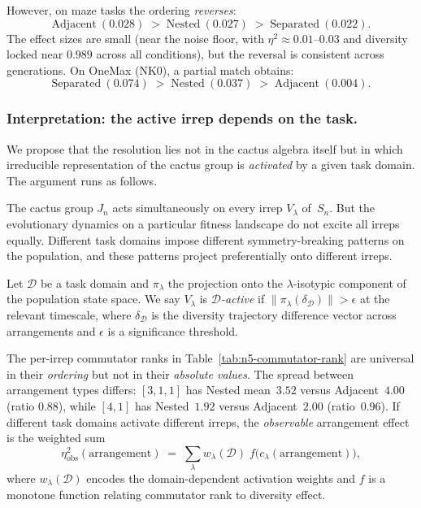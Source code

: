 
However, on maze tasks the ordering \emph{reverses}:
\[
  \text{Adjacent}~(0.028) \;>\;
  \text{Nested}~(0.027) \;>\;
  \text{Separated}~(0.022).
\]
The effect sizes are small (near the noise floor, with $\eta^2 \approx
0.01$--$0.03$ and diversity locked near $0.989$ across all conditions),
but the reversal is consistent across generations.  On OneMax (NK0),
a partial match obtains:
\[
  \text{Separated}~(0.074) \;>\;
  \text{Nested}~(0.037) \;>\;
  \text{Adjacent}~(0.004).
\]

\subsubsection{Interpretation: the active irrep depends on the task.}

We propose that the resolution lies not in the cactus algebra itself
but in which irreducible representation of the cactus group is
\emph{activated} by a given task domain.  The argument runs as
follows.

The cactus group $J_n$ acts simultaneously on every irrep $V_\lambda$
of~$S_n$.  But the evolutionary dynamics on a particular fitness
landscape do not excite all irreps equally.  Different task domains
impose different symmetry-breaking patterns on the population, and
these patterns project preferentially onto different irreps.

\begin{definition}
\label{def:active-irrep}
Let $\mathcal{D}$ be a task domain and $\pi_\lambda$ the projection
onto the $\lambda$-isotypic component of the population state space.
We say $V_\lambda$ is \emph{$\mathcal{D}$-active} if
$\|\pi_\lambda(\delta_{\mathcal{D}})\| > \epsilon$ at the relevant
timescale, where $\delta_{\mathcal{D}}$ is the diversity trajectory
difference vector across arrangements and $\epsilon$ is a
significance threshold.
\end{definition}

The per-irrep commutator ranks in Table~\ref{tab:n5-commutator-rank}
are universal in their \emph{ordering} but not in their \emph{absolute
values}.  The spread between arrangement types differs:
$[3,1,1]$ has Nested mean~$3.52$ versus Adjacent~$4.00$ (ratio
$0.88$), while $[4,1]$ has Nested~$1.92$ versus Adjacent~$2.00$
(ratio~$0.96$).  If different task domains activate different
irreps, the \emph{observable} arrangement effect is the
weighted sum
\begin{equation}
\label{eq:weighted-arrangement}
  \eta^2_{\mathrm{obs}}(\text{arrangement})
  \;=\;
  \sum_\lambda
    w_\lambda(\mathcal{D})\;
    f\bigl(c_\lambda(\text{arrangement})\bigr),
\end{equation}
where $w_\lambda(\mathcal{D})$ encodes the domain-dependent activation
weights and $f$ is a monotone function relating commutator rank to
diversity effect.

